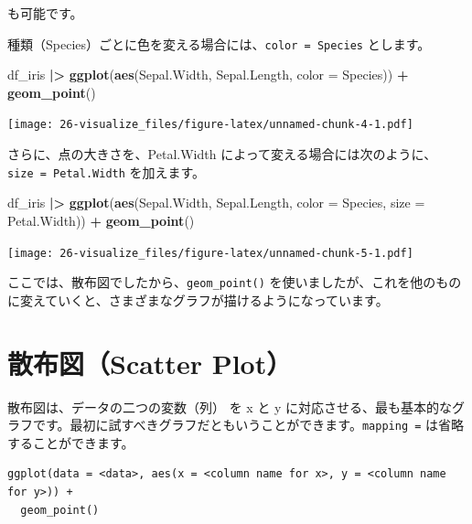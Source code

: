 \documentclass[
  xelatex, ja=standard]{bxjsbook}
\newenvironment{Shaded}{\begin{snugshade}}{\end{snugshade}}
\newcommand{\AttributeTok}[1]{\textcolor[rgb]{0.13,0.29,0.53}{#1}}
\newcommand{\FunctionTok}[1]{\textcolor[rgb]{0.13,0.29,0.53}{\textbf{#1}}}
\newcommand{\NormalTok}[1]{#1}
\newcommand{\SpecialCharTok}[1]{\textcolor[rgb]{0.81,0.36,0.00}{\textbf{#1}}}
\theoremstyle{definition}
\theoremstyle{definition}
\theoremstyle{definition}
\theoremstyle{definition}
\theoremstyle{remark}
\begin{document}
も可能です。

種類（Species）ごとに色を変える場合には、\texttt{color\ =\ Species} とします。

\begin{Shaded}
\begin{Highlighting}[]
\NormalTok{df\_iris }\SpecialCharTok{|\textgreater{}} \FunctionTok{ggplot}\NormalTok{(}\FunctionTok{aes}\NormalTok{(Sepal.Width, Sepal.Length, }\AttributeTok{color =}\NormalTok{ Species)) }\SpecialCharTok{+}
  \FunctionTok{geom\_point}\NormalTok{()}
\end{Highlighting}
\end{Shaded}

\texttt{[image: 26-visualize\_files/figure-latex/unnamed-chunk-4-1.pdf]}

さらに、点の大きさを、Petal.Width によって変える場合には次のように、\texttt{size\ =\ Petal.Width} を加えます。

\begin{Shaded}
\begin{Highlighting}[]
\NormalTok{df\_iris }\SpecialCharTok{|\textgreater{}} 
  \FunctionTok{ggplot}\NormalTok{(}\FunctionTok{aes}\NormalTok{(Sepal.Width, Sepal.Length, }\AttributeTok{color =}\NormalTok{ Species, }
             \AttributeTok{size =}\NormalTok{ Petal.Width)) }\SpecialCharTok{+}
  \FunctionTok{geom\_point}\NormalTok{()}
\end{Highlighting}
\end{Shaded}

\texttt{[image: 26-visualize\_files/figure-latex/unnamed-chunk-5-1.pdf]}

ここでは、散布図でしたから、\texttt{geom\_point()} を使いましたが、これを他のものに変えていくと、さまざまなグラフが描けるようになっています。

\hypertarget{ux6563ux5e03ux56f3scatter-plot}{%
\section{散布図（Scatter Plot）}\label{ux6563ux5e03ux56f3scatter-plot}}

散布図は、データの二つの変数（列） を x と y に対応させる、最も基本的なグラフです。最初に試すべきグラフだともいうことができます。\texttt{mapping\ =} は省略することができます。

\begin{verbatim}
ggplot(data = <data>, aes(x = <column name for x>, y = <column name for y>)) +
  geom_point()
\end{verbatim}
\end{document}
